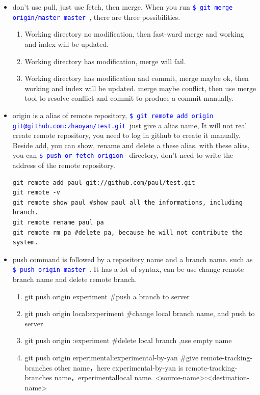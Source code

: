 \documentclass[a4paper,12pt,twoside]{book}
\newcommand{\linuxcommand}[1]{\texttt{\textcolor{blue}{\$ #1 \Pisymbol{psy}{191}}}}
\begin{document}
\begin{itemize}
\item don't use pull, just use fetch, then merge.  When you run \linuxcommand{git merge origin/master master}, there are three possibilities. 
		\begin{enumerate}
				\item Working directory no modification, then fast-ward merge and working and index will be updated. 
				\item Working directory has modification, merge will fail. 
				\item Working directory has modification and commit, merge maybe ok, then working and index will be updated. merge maybe conflict, then use merge tool to resolve conflict and commit to produce a commit manually.
		\end{enumerate}

\item origin is a alias of remote repository,  \linuxcommand{git remote add origin git@github.com:zhaoyan/test.git}just give a alias name, It will not real create remote repository, you need to log in github to create it manually.  Beside add, you can show, rename and delete a these alias. with these alias, you can \linuxcommand{push or fetch origion} directory, don't need to write the address of the remote repository.

\begin{verbatim}
git remote add paul git://github.com/paul/test.git
git remote -v
git remote show paul #show paul all the informations, including branch.
git remote rename paul pa
git remote rm pa #delete pa, because he will not contribute the system.
\end{verbatim}

\item push command is followed by a repository name and a branch name.  such as \linuxcommand{push origin master}. It has a lot of syntax, can be use change remote branch name and delete remote branch.
\begin{enumerate}
\item git push origin experiment \#push a branch to server
\item git push origin local:experiment \#change local branch name, and push to server. 
\item git push origin :experiment \#delete local branch ,use empty name 
\item git push origin erperimental:experimental-by-yan \#give remote-tracking-branches other name，here experimental-by-yan is remote-tracking-branches name，erperimentallocal name. <source-name>:<destination-name>
\end{enumerate}

\end{itemize}
\end{document}
